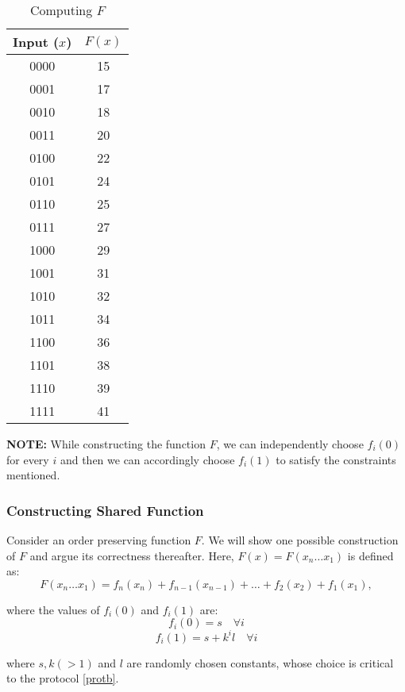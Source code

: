 \documentclass[11pt, letterpaper, romanappendices, onecolumn]{article}
\theoremstyle{plain}\newtheorem{thm}{Theorem}[section]
\theoremstyle{definition}
\theoremstyle{remark}
\begin{document}
\begin{table}
	\begin{center}
	\begin{tabular}{|c|c|}\hline 
		Input ($x$) & $F(x)$ \\\hline 
		0000 & 15 \\\hline 
		0001 & 17 \\\hline
		0010 & 18 \\\hline 
		0011 & 20 \\\hline
		0100 & 22 \\\hline
		0101 & 24 \\\hline
		0110 & 25 \\\hline
		0111 & 27 \\\hline
		1000 & 29 \\\hline
		1001 & 31 \\\hline
		1010 & 32 \\\hline
		1011 & 34 \\\hline
		1100 & 36 \\\hline
		1101 & 38 \\\hline
		1110 & 39 \\\hline
		1111 & 41 \\\hline 
	\end{tabular} 
	\end{center}
	\caption{Computing $F$} \label{tab:2}
\end{table}

\par \textbf{NOTE:} While constructing the function $F$, we can independently choose $f_{i}(0)$ for every $i$ and then we can accordingly choose $f_{i}(1)$ to satisfy the constraints mentioned.

\subsubsection{Constructing Shared Function} \label{shared}
\par Consider an order preserving function $F$. We will show one possible construction of $F$ and argue its correctness thereafter.
Here, $F(x)=F(x_n\ldots x_1)$ is defined as:
\[
	F(x_n\ldots x_1) = f_n(x_n) + f_{n-1}(x_{n-1}) + \ldots +f_2(x_2) + f_1(x_1),
\]
\par where the values of $f_i(0)$ and $f_i(1)$ are:
\[
	f_i(0)=s \quad \forall i
\]
\[
	f_i(1)=s+k^il \quad \forall i
\]
\par \quad where $s,k (>1)$ and $l$ are randomly chosen constants, whose choice is critical to the protocol \ref{protb}.
\end{document}
